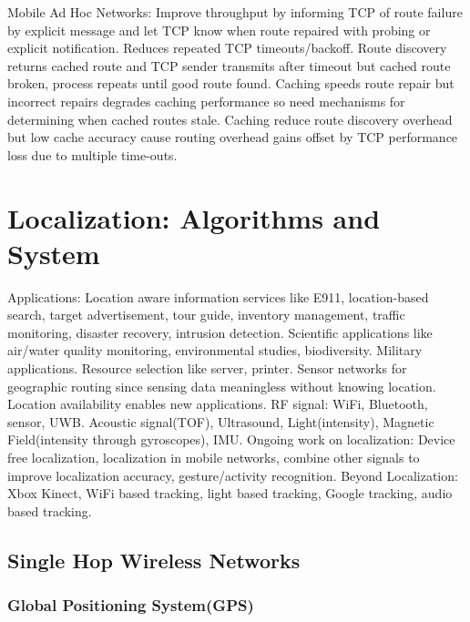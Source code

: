 \documentclass[9pt]{extarticle}
\begin{document}
\begin{multicols}{2}
Mobile Ad Hoc Networks: Improve throughput by informing TCP of route failure by explicit message and let TCP know when route repaired with probing or explicit notification. Reduces repeated TCP timeouts/backoff. Route discovery returns cached route and TCP sender transmits after timeout but cached route broken, process repeats until good route found. Caching speeds route repair but incorrect repairs degrades caching performance so need mechanisms for determining when cached routes stale. Caching reduce route discovery overhead but low cache accuracy cause routing overhead gains offset by TCP performance loss due to multiple time-outs.     

\section{Localization: Algorithms and System}

Applications: Location aware information services like E911, location-based search, target advertisement, tour guide, inventory management, traffic monitoring, disaster recovery, intrusion detection. Scientific applications like air/water quality monitoring, environmental studies, biodiversity. Military applications. Resource selection like server, printer. Sensor networks for geographic routing since sensing data meaningless without knowing location. Location availability enables new applications. RF signal: WiFi, Bluetooth, sensor, UWB. Acoustic signal(TOF), Ultrasound, Light(intensity), Magnetic Field(intensity through gyroscopes), IMU. Ongoing work on localization: Device free localization, localization in mobile networks, combine other signals to improve localization accuracy, gesture/activity recognition. Beyond Localization: Xbox Kinect, WiFi based tracking, light based tracking, Google tracking, audio based tracking.

\subsection{Single Hop Wireless Networks}

\subsubsection{Global Positioning System(GPS)}


\end{multicols}
\end{document}

